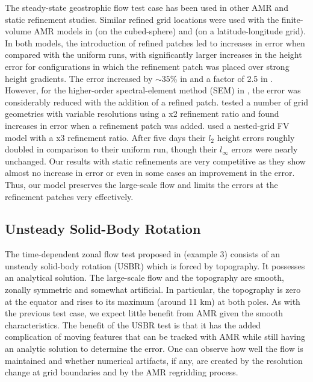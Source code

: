 The steady-state geostrophic flow test case has been used in other AMR
and static refinement studies.  Similar refined grid locations were used
with the finite-volume AMR models in
\cite{Chen:2011kk} (on the cubed-sphere) and
\cite{st2007comparison} (on a latitude-longitude grid).  In both models, the introduction of refined
patches led to increases in error when compared with the uniform runs,
with significantly larger increases in the height error for
configurations in which the refinement patch was placed over 
strong height gradients.  The error increased by $\sim 35\%$ in
\cite{Chen:2011kk} and a factor of 2.5 in
\cite{st2007comparison}.  However, for the higher-order spectral-element
method (SEM) in
\cite{st2007comparison}, the error was considerably reduced with
the addition of a refined patch.
\cite{Weller:2009gl} tested a number of grid geometries with variable
resolutions using a x2 refinement ratio and found increases in error
when a refinement patch was added.
\cite{Harris:2013nt} used a nested-grid FV model with a x3 refinement
ratio. After five days their $l_2$ height errors roughly doubled in 
comparison to their uniform run, though their $l_\infty$ errors were nearly unchanged.
Our results with static refinements are very competitive as they show
almost no increase in error or even in some cases an improvement in the
error.  Thus, our model preserves the
large-scale flow and limits the errors at the refinement patches very effectively.

\subsection{Unsteady Solid-Body Rotation}
\label{subsec:usbr}

The time-dependent zonal flow test proposed in
\cite{Lauter:2005uq} (example 3) consists of an unsteady solid-body rotation (USBR) which is
forced by topography. It possesses an analytical solution.  The large-scale flow and
the topography are smooth, zonally symmetric and somewhat artificial.  
In particular, the topography is zero at the equator and rises to its maximum (around 11 km) at both poles.
As with the previous test case, we
expect little benefit from AMR given the smooth characteristics.  The
benefit of the USBR test is that it has the added complication of moving
features that can be tracked with AMR while still having an analytic
solution to determine the error. One can observe how well the flow is
maintained and whether numerical artifacts, if any, are created by the
resolution change at grid boundaries and by the AMR regridding process.

